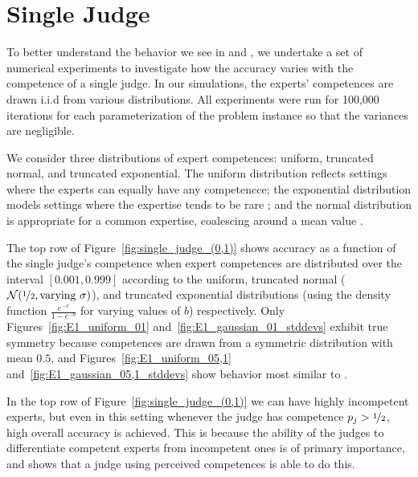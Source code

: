 \documentclass[letterpaper]{article} %
\newcommand{\judge}{\ensuremath{j} }
\newcommand{\ben}[1]{\textcolor{red}{Ben says: #1}}
\newcommand{\omer}[1]{\textcolor{purple}{Omer says: #1}}
\begin{document}
\section{Single Judge}
To better understand the behavior we see in  and , we undertake a set of numerical experiments to investigate how the accuracy varies with the competence of a single judge.
%
In our simulations, the experts' competences are drawn i.i.d from various distributions. All experiments were run for 100,000 iterations for each parameterization of the problem instance so that the variances are negligible.

We consider three distributions of expert competences: uniform, truncated normal, and truncated exponential. The uniform distribution reflects settings where the experts can equally have any competencce; the exponential distribution models settings where the expertise tends to be rare%
; and the normal distribution is appropriate for a common expertise, coalescing around a mean value \cite{Tal07}. %
 
The top row of Figure~\ref{fig:single_judge_(0,1)} shows accuracy as a function of the single judge's competence when expert competences are distributed over the interval $[0.001, 0.999]$ according to the uniform, truncated normal ($\mathcal{N}(\nicefrac{1}{2},\text{varying }\sigma)$), and truncated exponential distributions (using the density function $\frac{e^{-x}}{1-e^{-b}}$ for varying values of $b$) respectively. Only Figures~\ref{fig:E1_uniform_01} and~\ref{fig:E1_gaussian_01_stddevs} exhibit true symmetry because competences are drawn from a symmetric distribution with mean $0.5$, and Figures~\ref{fig:E1_uniform_05,1} and~\ref{fig:E1_gaussian_05,1_stddevs} show behavior most similar to .%

In the top row of Figure~\ref{fig:single_judge_(0,1)} we can have highly incompetent experts, but even in this setting whenever the judge has competence $p_\judge > \nicefrac{1}{2}$, high overall accuracy is achieved. This is because the ability of the judges to differentiate competent experts from incompetent ones is of primary importance, and  shows that a judge using perceived competences is able to do this.
\end{document}
